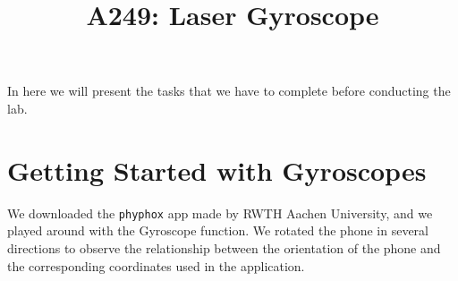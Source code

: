 \documentclass[a4paper]{article}
\begin{document}
\title{A249: Laser Gyroscope}
\maketitle 

In here we will present the tasks that we have to complete before conducting the lab. 

\section{Getting Started with Gyroscopes}

We downloaded the \texttt{phyphox} app made by RWTH Aachen University, and we played around with the Gyroscope function. We rotated the phone in several directions 
to observe the relationship between the orientation of the phone and the corresponding coordinates used in the application. 
\end{document}
